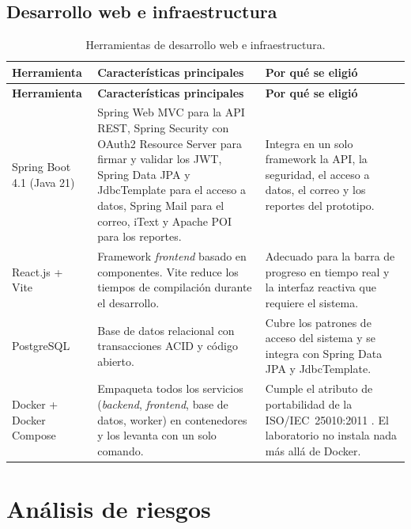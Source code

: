 \subsection{Desarrollo web e infraestructura}

\begin{longtable}{|p{2.7cm}|p{5.2cm}|p{5.2cm}|}
\caption{Herramientas de desarrollo web e infraestructura.
\label{tab:herr_web}}\\
\hline
\textbf{Herramienta} & \textbf{Características principales} & \textbf{Por qué se eligió} \\
\hline
\endfirsthead
\hline
\textbf{Herramienta} & \textbf{Características principales} & \textbf{Por qué se eligió} \\
\hline
\endhead
\hline
\endfoot

Spring Boot 4.1 (Java 21)
    & Spring Web MVC para la API REST, Spring Security con OAuth2 Resource Server para firmar y validar los JWT,
      Spring Data JPA y JdbcTemplate para el acceso a datos, Spring Mail para el correo, iText y Apache POI para los reportes.
    & Integra en un solo framework la API, la seguridad, el acceso a datos, el correo y los reportes del prototipo. \\
\hline
React.js + Vite
    & Framework \textit{frontend} basado en componentes. Vite reduce los tiempos de
      compilación durante el desarrollo.
    & Adecuado para la barra de progreso en tiempo real y la interfaz reactiva
      que requiere el sistema. \\
\hline
PostgreSQL
    & Base de datos relacional con transacciones ACID y código abierto.
    & Cubre los patrones de acceso del sistema y se integra con Spring Data JPA y JdbcTemplate. \\
\hline
Docker + Docker Compose \cite{merkel2014}
    & Empaqueta todos los servicios (\textit{backend}, \textit{frontend}, base de datos, worker) en
      contenedores y los levanta con un solo comando.
    & Cumple el atributo de portabilidad de la ISO/IEC~25010:2011
      \cite{iso25010}. El laboratorio no instala nada más allá de Docker. \\
\hline

\end{longtable}

\section{Análisis de riesgos}

